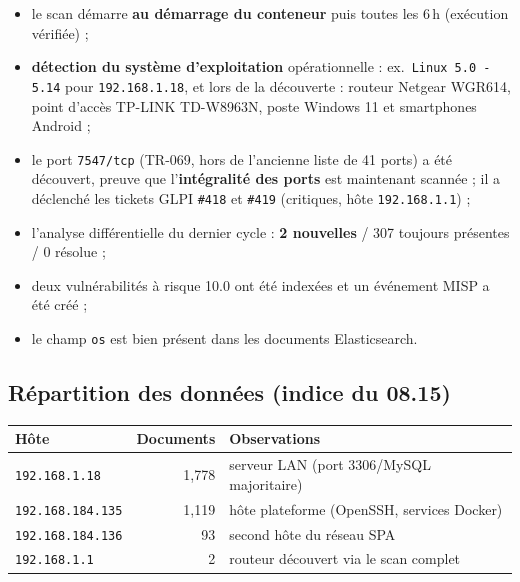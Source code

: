\documentclass[11pt,a4paper]{article}
\begin{document}
\begin{itemize}[leftmargin=1.6em]
  \item le scan d\'emarre \textbf{au d\'emarrage du conteneur} puis toutes
        les 6\,h (ex\'ecution v\'erifi\'ee) ;
  \item \textbf{d\'etection du syst\`eme d'exploitation} op\'erationnelle :
        ex.\ \texttt{Linux 5.0 - 5.14} pour \texttt{192.168.1.18}, et lors de
        la d\'ecouverte : routeur Netgear WGR614, point d'acc\`es TP-LINK
        TD-W8963N, poste Windows 11 et smartphones Android ;
  \item le port \texttt{7547/tcp} (TR-069, hors de l'ancienne liste de 41
        ports) a \'et\'e d\'ecouvert, preuve que l'\textbf{int\'egralit\'e des
        ports} est maintenant scann\'ee ; il a d\'eclench\'e les tickets GLPI
        \texttt{\#418} et \texttt{\#419} (critiques, h\^ote
        \texttt{192.168.1.1}) ;
  \item l'analyse diff\'erentielle du dernier cycle : \textbf{2 nouvelles} /
        307 toujours pr\'esentes / 0 r\'esolue ;
  \item deux vuln\'erabilit\'es \`a risque 10.0 ont \'et\'e index\'ees et un
        \'ev\'enement MISP a \'et\'e cr\'e\'e ;
  \item le champ \texttt{os} est bien pr\'esent dans les documents
        Elasticsearch.
\end{itemize}

\subsection{R\'epartition des donn\'ees (indice du 08.15)}

\begin{center}
\small
\begin{tabularx}{\linewidth}{@{}l r X@{}}
\toprule
\textbf{H\^ote} & \textbf{Documents} & \textbf{Observations} \\
\midrule
\texttt{192.168.1.18} & 1{,}778 & serveur LAN (port 3306/MySQL majoritaire) \\
\texttt{192.168.184.135} & 1{,}119 & h\^ote plateforme (OpenSSH, services Docker) \\
\texttt{192.168.184.136} & 93 & second h\^ote du r\'eseau SPA \\
\texttt{192.168.1.1} & 2 & routeur d\'ecouvert via le scan complet \\
\bottomrule
\end{tabularx}
\end{center}
\end{document}
